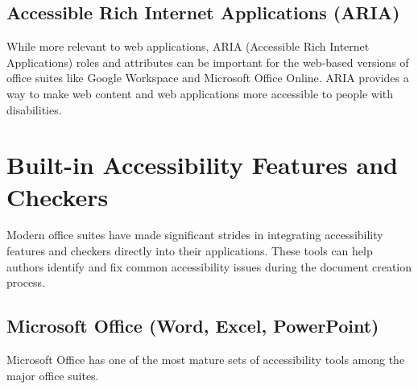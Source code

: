 \subsection{Accessible Rich Internet Applications (ARIA)}
\label{subsec:aria-office}
While more relevant to web applications, ARIA (Accessible Rich Internet Applications) roles and attributes can be important for the web-based versions of office suites like Google Workspace and Microsoft Office Online. ARIA provides a way to make web content and web applications more accessible to people with disabilities.

\section{Built-in Accessibility Features and Checkers}
\label{sec:built-in-accessibility-checkers}

Modern office suites have made significant strides in integrating accessibility features and checkers directly into their applications. These tools can help authors identify and fix common accessibility issues during the document creation process.

\subsection{Microsoft Office (Word, Excel, PowerPoint)}
\label{subsec:ms-office-accessibility}

Microsoft Office has one of the most mature sets of \gls{accessibility} tools among the major office suites.

